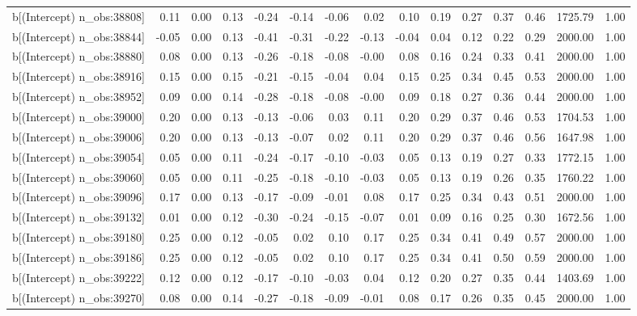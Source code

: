 \begin{table}[ht]
\begin{tabular}{rrrrrrrrrrrrrrr}
  b[(Intercept) n\_obs:38808] & 0.11 & 0.00 & 0.13 & -0.24 & -0.14 & -0.06 & 0.02 & 0.10 & 0.19 & 0.27 & 0.37 & 0.46 & 1725.79 & 1.00 \\ 
  b[(Intercept) n\_obs:38844] & -0.05 & 0.00 & 0.13 & -0.41 & -0.31 & -0.22 & -0.13 & -0.04 & 0.04 & 0.12 & 0.22 & 0.29 & 2000.00 & 1.00 \\ 
  b[(Intercept) n\_obs:38880] & 0.08 & 0.00 & 0.13 & -0.26 & -0.18 & -0.08 & -0.00 & 0.08 & 0.16 & 0.24 & 0.33 & 0.41 & 2000.00 & 1.00 \\ 
  b[(Intercept) n\_obs:38916] & 0.15 & 0.00 & 0.15 & -0.21 & -0.15 & -0.04 & 0.04 & 0.15 & 0.25 & 0.34 & 0.45 & 0.53 & 2000.00 & 1.00 \\ 
  b[(Intercept) n\_obs:38952] & 0.09 & 0.00 & 0.14 & -0.28 & -0.18 & -0.08 & -0.00 & 0.09 & 0.18 & 0.27 & 0.36 & 0.44 & 2000.00 & 1.00 \\ 
  b[(Intercept) n\_obs:39000] & 0.20 & 0.00 & 0.13 & -0.13 & -0.06 & 0.03 & 0.11 & 0.20 & 0.29 & 0.37 & 0.46 & 0.53 & 1704.53 & 1.00 \\ 
  b[(Intercept) n\_obs:39006] & 0.20 & 0.00 & 0.13 & -0.13 & -0.07 & 0.02 & 0.11 & 0.20 & 0.29 & 0.37 & 0.46 & 0.56 & 1647.98 & 1.00 \\ 
  b[(Intercept) n\_obs:39054] & 0.05 & 0.00 & 0.11 & -0.24 & -0.17 & -0.10 & -0.03 & 0.05 & 0.13 & 0.19 & 0.27 & 0.33 & 1772.15 & 1.00 \\ 
  b[(Intercept) n\_obs:39060] & 0.05 & 0.00 & 0.11 & -0.25 & -0.18 & -0.10 & -0.03 & 0.05 & 0.13 & 0.19 & 0.26 & 0.35 & 1760.22 & 1.00 \\ 
  b[(Intercept) n\_obs:39096] & 0.17 & 0.00 & 0.13 & -0.17 & -0.09 & -0.01 & 0.08 & 0.17 & 0.25 & 0.34 & 0.43 & 0.51 & 2000.00 & 1.00 \\ 
  b[(Intercept) n\_obs:39132] & 0.01 & 0.00 & 0.12 & -0.30 & -0.24 & -0.15 & -0.07 & 0.01 & 0.09 & 0.16 & 0.25 & 0.30 & 1672.56 & 1.00 \\ 
  b[(Intercept) n\_obs:39180] & 0.25 & 0.00 & 0.12 & -0.05 & 0.02 & 0.10 & 0.17 & 0.25 & 0.34 & 0.41 & 0.49 & 0.57 & 2000.00 & 1.00 \\ 
  b[(Intercept) n\_obs:39186] & 0.25 & 0.00 & 0.12 & -0.05 & 0.02 & 0.10 & 0.17 & 0.25 & 0.34 & 0.41 & 0.50 & 0.59 & 2000.00 & 1.00 \\ 
  b[(Intercept) n\_obs:39222] & 0.12 & 0.00 & 0.12 & -0.17 & -0.10 & -0.03 & 0.04 & 0.12 & 0.20 & 0.27 & 0.35 & 0.44 & 1403.69 & 1.00 \\ 
  b[(Intercept) n\_obs:39270] & 0.08 & 0.00 & 0.14 & -0.27 & -0.18 & -0.09 & -0.01 & 0.08 & 0.17 & 0.26 & 0.35 & 0.45 & 2000.00 & 1.00 \\ 

\end{tabular}
\end{table}

